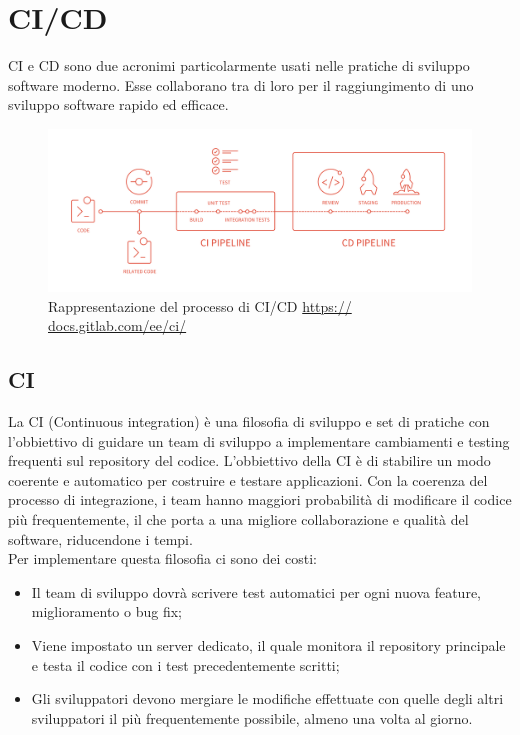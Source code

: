 \section{CI/CD}
\label{CICD}

CI e CD sono due acronimi particolarmente usati nelle pratiche di sviluppo software moderno. Esse collaborano tra di loro per il raggiungimento di uno sviluppo software rapido ed efficace. 

\begin{figure}[H]
\centering
	\includegraphics[width=0.9\linewidth]{./images/cicd_pipeline_gitlab.png} 
	\caption{Rappresentazione del processo di CI/CD \url{ https:// docs.gitlab.com/ee/ci/}}
	\label{vmodel}
\end{figure}

\subsection{CI}

La CI (Continuous integration) è una filosofia di sviluppo e set di pratiche con l'obbiettivo di guidare un team di sviluppo a implementare cambiamenti e testing frequenti sul repository del codice. 
L'obbiettivo della CI è di stabilire un modo coerente e automatico per costruire e testare applicazioni. Con la coerenza del processo di integrazione, i team hanno  maggiori probabilità di modificare il codice più frequentemente, il che porta a una migliore collaborazione e qualità del software, riducendone i tempi. \\
Per implementare questa filosofia ci sono dei costi: 
\begin{itemize}
	\item Il team di sviluppo dovrà scrivere test automatici per ogni nuova feature, miglioramento o bug fix;
	\item Viene impostato un server dedicato, il quale monitora il repository principale e testa il codice con i test precedentemente scritti;
	\item Gli sviluppatori devono mergiare le modifiche effettuate con quelle degli altri sviluppatori il più frequentemente possibile, almeno una volta al giorno. 
\end{itemize}

